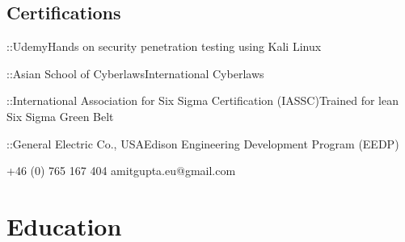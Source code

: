 \documentclass{tccv}
\begin{document}
\begin{eventlist}
\section{Certifications}
\begin{yearlist}
    \item{::}{Udemy}{Hands on security penetration testing using Kali Linux }  
    \item{::}{Asian School of Cyberlaws}{International Cyberlaws}
    \item{::}{International Association for Six Sigma Certification (IASSC)}{Trained for lean Six Sigma Green Belt}
    \item{::}{General Electric Co., USA}{Edison Engineering Development Program (EEDP)}
\end{yearlist}

\end{eventlist}


    {+46 (0) 765 167 404}
    {amitgupta.eu@gmail.com}

\section{Education}
\end{document}
